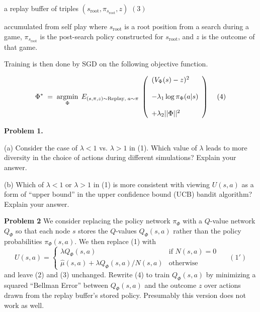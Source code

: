 \documentclass{article}
\begin{document}
\medskip
\centerline{a replay buffer of triples $(s_{\mathrm{root}},\pi_{s_{\mathrm{root}}},z)$ \hspace{2em}$(3)$}

\medskip
accumulated from self play where $s_{\mathrm{root}}$ is a root position from a search during a game,
$\pi_{s_{\mathrm{root}}}$ is the post-search policy constructed for $s_{\mathrm{root}}$, and $z$ is the outcome of that game.

\medskip
Training is then done by SGD on the following objective function.

$$\Phi^*\; = \;\operatorname*{argmin}_\Phi \;E_{(s,\pi,z) \sim \mathrm{Replay},\;a \sim \pi}\;\left(\begin{array}{l} (V_\Phi(s) - z)^2 \\ \\ - \lambda_1\log \pi_\Phi(a|s) \\ \\ + \lambda_2||\Phi||^2\end{array}\right)\;\;\;\;(4)$$

\bigskip
{\bf Problem 1.}
    
\medskip
(a) Consider the case of $\lambda < 1$ vs. $\lambda > 1$ in (1).  Which value of $\lambda$ leads to more diversity in the choice of actions during different simulations?  Explain your answer.

\medskip
(b) Which of $\lambda < 1$ or $\lambda > 1$ in (1) is more consistent with viewing $U(s,a)$ as a form of ``upper bound'' in the upper confidence bound (UCB) bandit algorithm?  Explain your answer.

\bigskip
{\bf Problem 2}
We consider replacing the policy network $\pi_\Phi$ with a $Q$-value network $Q_\Phi$ so that each node $s$ stores the $Q$-values $Q_\Phi(s,a)$ rather than
the policy probabilities $\pi_\Phi(s,a)$.  We then replace (1) with
$$U(s,a) =  \left\{\begin{array}{ll}\lambda Q_\Phi(s,a) &\mbox{if $N(s,a) = 0$} \\ \hat{\mu}(s,a) + \lambda Q_\Phi(s,a)/N(s,a) & \mbox{otherwise} \end{array}\right.\;\;\;\;\;(1')$$
and leave (2) and (3) unchanged.  Rewrite (4) to train $Q_\Phi(s,a)$ by minimizing a squared ``Bellman Error'' between $Q_\Phi(s,a)$ and the outcome $z$ over actions drawn from the replay buffer's stored policy.
Presumably this version does not work as well.
\end{document}
